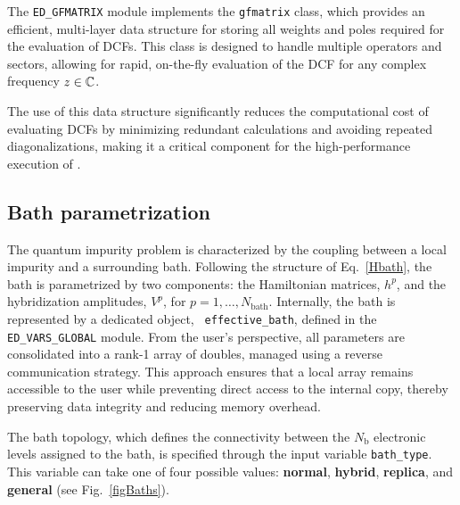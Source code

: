 \documentclass[edipack2.tex]{subfiles}
\begin{document}
The {\tt ED\_GFMATRIX} module implements the {\tt gfmatrix} class, 
which provides an efficient, multi-layer data structure for storing 
all weights and poles required for the evaluation of DCFs. This 
class is designed to handle multiple operators and sectors, allowing 
for rapid, on-the-fly evaluation of the DCF for any complex frequency 
$z\in\mathbb{C}$.

The use of this data structure significantly reduces the computational 
cost of evaluating DCFs by minimizing redundant calculations and 
avoiding repeated diagonalizations, making it a critical component 
for the high-performance execution of \NAME.





















\subsection{Bath parametrization}\label{sSecBath}
The quantum impurity problem is characterized by the coupling between
a local impurity and a surrounding bath. Following the structure of
Eq.~\ref{Hbath}, the bath is parametrized by two components: the
Hamiltonian matrices, $h^p$, and the hybridization amplitudes,
$V^p$, for $p = 1, \dots, N_\mathrm{bath}$.
Internally, the bath is represented by a dedicated object, {\tt
  effective\_bath}, defined in the {\tt ED\_VARS\_GLOBAL} module. From
the user's perspective, all parameters are consolidated into a rank-1
array of doubles, managed using a reverse communication strategy. This
approach ensures that a local array remains accessible to the
user while preventing direct access to the internal copy, thereby
preserving data integrity and reducing memory overhead.


The bath topology, which defines the connectivity between the
$N_\mathrm{b}$ electronic levels assigned to the bath, is specified
through the input variable {\tt bath\_type}. This variable can take
one of four possible values: {\bf normal}, {\bf hybrid}, {\bf
  replica}, and {\bf general} (see Fig.~\ref{figBaths}).
\end{document}
